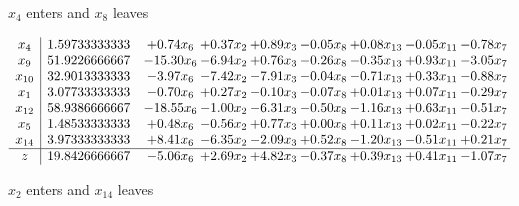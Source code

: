 \documentclass[8pt]{article}
\begin{document}
 $ x_{4} $ enters and $ x_{8} $ leaves 

 \[\begin{array}{c| c c@{\hskip 2pt} c@{\hskip 2pt} c@{\hskip 2pt} c@{\hskip 2pt} c@{\hskip 2pt} c@{\hskip 2pt} c@{\hskip 2pt} }
 x_{4}   &  1.59733333333 & +  0.74 x_{6} & +  0.37 x_{2} & +  0.89 x_{3} & -0.05 x_{8} & +  0.08 x_{13} & -0.05 x_{11} & -0.78 x_{7}\\
 x_{9}   &  51.9226666667 & -15.30 x_{6} & -6.94 x_{2} & +  0.76 x_{3} & -0.26 x_{8} & -0.35 x_{13} & +  0.93 x_{11} & -3.05 x_{7}\\
 x_{10}   &  32.9013333333 & -3.97 x_{6} & -7.42 x_{2} & -7.91 x_{3} & -0.04 x_{8} & -0.71 x_{13} & +  0.33 x_{11} & -0.88 x_{7}\\
 x_{1}   &  3.07733333333 & -0.70 x_{6} & +  0.27 x_{2} & -0.10 x_{3} & -0.07 x_{8} & +  0.01 x_{13} & +  0.07 x_{11} & -0.29 x_{7}\\
 x_{12}   &  58.9386666667 & -18.55 x_{6} & -1.00 x_{2} & -6.31 x_{3} & -0.50 x_{8} & -1.16 x_{13} & +  0.63 x_{11} & -0.51 x_{7}\\
 x_{5}   &  1.48533333333 & +  0.48 x_{6} & -0.56 x_{2} & +  0.77 x_{3} & +  0.00 x_{8} & +  0.11 x_{13} & +  0.02 x_{11} & -0.22 x_{7}\\
 x_{14}   &  3.97333333333 & +  8.41 x_{6} & -6.35 x_{2} & -2.09 x_{3} & +  0.52 x_{8} & -1.20 x_{13} & -0.51 x_{11} & +  0.21 x_{7}\\
\hline
z    &  19.8426666667 & -5.06 x_{6} & +  2.69 x_{2} & +  4.82 x_{3} & -0.37 x_{8} & +  0.39 x_{13} & +  0.41 x_{11} & -1.07 x_{7}\\
\end{array}\]


 $ x_{2} $ enters and $ x_{14} $ leaves 
\end{document}

